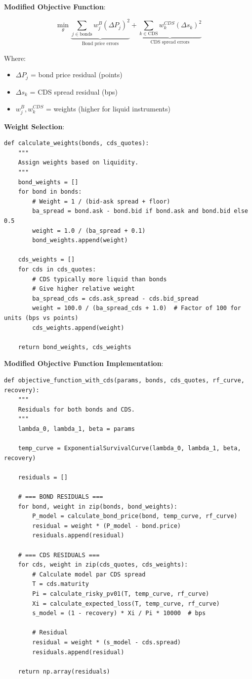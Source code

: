 \documentclass[11pt,a4paper]{article}
\begin{document}
\begin{implbox}
\textbf{Modified Objective Function}:

\begin{equation}
\min_{\theta} \underbrace{\sum_{j \in \text{bonds}} w_j^B (\Delta P_j)^2}_{\text{Bond price errors}} + \underbrace{\sum_{k \in \text{CDS}} w_k^{CDS} (\Delta s_k)^2}_{\text{CDS spread errors}}
\end{equation}

Where:
\begin{itemize}
    \item $\Delta P_j$ = bond price residual (points)
    \item $\Delta s_k$ = CDS spread residual (bps)
    \item $w_j^B, w_k^{CDS}$ = weights (higher for liquid instruments)
\end{itemize}

\textbf{Weight Selection}:
\begin{lstlisting}
def calculate_weights(bonds, cds_quotes):
    """
    Assign weights based on liquidity.
    """
    bond_weights = []
    for bond in bonds:
        # Weight = 1 / (bid-ask spread + floor)
        ba_spread = bond.ask - bond.bid if bond.ask and bond.bid else 0.5
        weight = 1.0 / (ba_spread + 0.1)
        bond_weights.append(weight)
    
    cds_weights = []
    for cds in cds_quotes:
        # CDS typically more liquid than bonds
        # Give higher relative weight
        ba_spread_cds = cds.ask_spread - cds.bid_spread
        weight = 100.0 / (ba_spread_cds + 1.0)  # Factor of 100 for units (bps vs points)
        cds_weights.append(weight)
    
    return bond_weights, cds_weights
\end{lstlisting}

\textbf{Modified Objective Function Implementation}:
\begin{lstlisting}
def objective_function_with_cds(params, bonds, cds_quotes, rf_curve, recovery):
    """
    Residuals for both bonds and CDS.
    """
    lambda_0, lambda_1, beta = params
    
    temp_curve = ExponentialSurvivalCurve(lambda_0, lambda_1, beta, recovery)
    
    residuals = []
    
    # === BOND RESIDUALS ===
    for bond, weight in zip(bonds, bond_weights):
        P_model = calculate_bond_price(bond, temp_curve, rf_curve)
        residual = weight * (P_model - bond.price)
        residuals.append(residual)
    
    # === CDS RESIDUALS ===
    for cds, weight in zip(cds_quotes, cds_weights):
        # Calculate model par CDS spread
        T = cds.maturity
        Pi = calculate_risky_pv01(T, temp_curve, rf_curve)
        Xi = calculate_expected_loss(T, temp_curve, rf_curve)
        s_model = (1 - recovery) * Xi / Pi * 10000  # bps
        
        # Residual
        residual = weight * (s_model - cds.spread)
        residuals.append(residual)
    
    return np.array(residuals)
\end{lstlisting}
\end{implbox}
\end{document}
